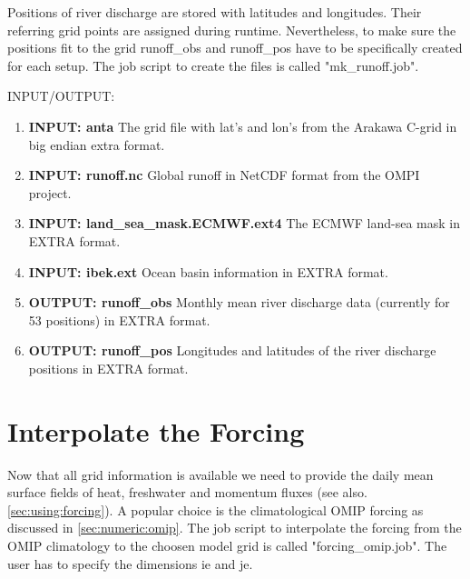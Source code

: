 Positions of river discharge are stored with latitudes and longitudes. Their referring grid points are 
assigned during runtime. Nevertheless, to make sure the positions fit to the grid runoff\_obs 
and runoff\_pos have to be specifically created for each setup. 
The job script to create the files is called "mk\_runoff.job".

INPUT/OUTPUT:
\begin{enumerate}

\item \textbf{INPUT: anta} \newline
The grid file with lat's  and lon's from the Arakawa C-grid
in big endian extra format.

\item \textbf{INPUT: runoff.nc} \newline
Global runoff in NetCDF format from the OMPI project.

\item \textbf{INPUT: land\_sea\_mask.ECMWF.ext4} \newline
The ECMWF land-sea mask in EXTRA format. 

\item \textbf{INPUT: ibek.ext} \newline
Ocean basin information in EXTRA format.

\item \textbf{OUTPUT: runoff\_obs} \newline
 Monthly mean river discharge data (currently for 53 positions) in EXTRA format.

\item \textbf{OUTPUT: runoff\_pos} \newline
 Longitudes and latitudes of the river discharge positions in EXTRA format.

\end{enumerate}

\section[Interpolate the Forcing]
{\Large{\bf Interpolate the Forcing}\label{ch:setup:forcing}}

Now that all grid information is available we need to provide the daily mean surface fields
of heat, freshwater and momentum fluxes (see also.\ref{sec:using:forcing}).
A popular choice is the climatological OMIP forcing as discussed in \ref{sec:numeric:omip}.
The job script to interpolate the forcing from the OMIP climatology 
to the choosen model grid is called
"forcing\_omip.job". The user has to specify the dimensions ie and je.


